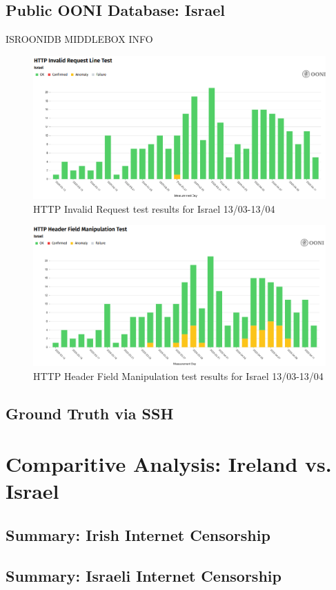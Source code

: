 \subsection{Public OONI Database: Israel}
ISROONIDB MIDDLEBOX INFO
\begin{figure} [H]
    \centering
    \includegraphics[width=0.5\linewidth]{ISROONIDBMB1.png}
    \caption{HTTP Invalid Request test results for Israel 13/03-13/04}
    \label{fig:enter-label}
\end{figure}

\begin{figure} [H]
    \centering
    \includegraphics[width=0.5\linewidth]{ISROONIDBMB2.png}
    \caption{HTTP Header Field Manipulation test results for Israel 13/03-13/04}
    \label{fig:enter-label}
\end{figure}

\subsection{Ground Truth via SSH}

\section{Comparitive Analysis: Ireland vs. Israel}
\subsection{Summary: Irish Internet Censorship}
\subsection{Summary: Israeli Internet Censorship}
\subsection{}

